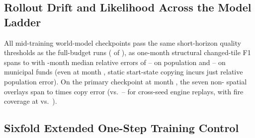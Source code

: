 \subsection{Rollout Drift and Likelihood Across the Model Ladder}\label{app:ladderfid}

All \TestHalfN{} mid-training world-model checkpoints pass the same short-horizon quality thresholds as the full-budget runs (\TestHalfPass{} of \TestHalfN{}), as one-month structural changed-tile F1 spans \TestHalfFOneMin{} to \TestHalfFOneMax{} with \RollA-month median relative errors of \TestHalfPopMin{}--\TestHalfPopMax{} on population and \TestHalfFundsMin{}--\TestHalfFundsMax{} on municipal funds (even at month \RollA{}, static start-state copying incurs just \TestCopyPop{} relative population error). On the primary checkpoint at month \Horizon{}, the seven non-\HorBestOverlay{} spatial overlays span \HorRestMin{} to \HorRestMax{} times copy error (vs.\ \HorEngMin{}--\HorEngMax{} for cross-seed engine replays, with fire coverage at \HorFireEmu{} vs.\ \HorFireEng{}). \ifHorizonDone\HorLadderSentence\fi{} \ifLogVerdDone\LogVerdLadderSentence\fi{}

\subsection{Sixfold Extended One-Step Training Control}\label{app:extended}

